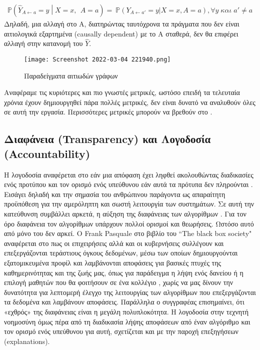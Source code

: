 \begin{align}
 \mathbb{P}\left({\hat{Y}}_{A\gets a}=y\middle| X=x,\ \ A=a\right)=\ \mathbb{P}(Y_{A\gets a\prime}=y|X=x,A=a),∀ y   \; και \; a'≠a
\end{align}
Δηλαδή, μια αλλαγή στο A, διατηρώντας ταυτόχρονα τα πράγματα που δεν είναι αιτιολογικά εξαρτημένα (causally dependent) με το Α σταθερά, δεν θα επιφέρει αλλαγή στην κατανομή του $  \hat{Y }$.\\
\begin{figure}[H]
	\centering
	\texttt{[image: Screenshot 2022-03-04 221940.png]}
	\caption{Παραδείγματα αιτιωδών γράφων}
	\label{fig:countfairness}
\end{figure}
\noindent Αναφέραμε τις κυριότερες και πιο γνωστές μετρικές, ωστόσο επειδή τα τελευταία χρόνια έχουν δημιουργηθεί πάρα πολλές μετρικές, δεν είναι δυνατό να αναλυθούν όλες σε αυτή την εργασία. Περισσότερες μετρικές μπορούν να βρεθούν στο \cite{catonFairnessMachineLearning2020}.
\subsection{Διαφάνεια (Transparency) και Λογοδοσία (Accountability)}
\noindent Η λογοδοσία αναφέρεται στο εάν μια απόφαση έχει ληφθεί ακολουθώντας διαδικασίες ενός προτύπου και τον ορισμό ενός υπεύθυνου εάν αυτά τα πρότυπα δεν πληρούνται \cite{krollAccountableAlgorithms}. Εισάγει δηλαδή και την σημασία του ανθρώπινου παράγοντα ως απαραίτητη προϋπόθεση για την αμερόληπτη και σωστή λειτουργία των συστημάτων. Σε αυτή την κατεύθυνση συμβάλλει αρκετά, η αύξηση της διαφάνειας των αλγορίθμων \cite{diakopoulosAccountabilityAlgorithmicDecision2016}. Για τον όρο διαφάνεια τον αλγορίθμων υπάρχουν πολλοί ορισμοί και θεωρήσεις. Ωστόσο αυτό από μόνο του δεν αρκεί. Ο Frank Pasquale στο βιβλίο του ``The black box society" \cite{pasqualeBlackBoxSociety2015} αναφέρεται στο πως οι επιχειρήσεις αλλά και οι κυβερνήσεις συλλέγουν και επεξεργάζονται τεράστιους όγκους δεδομένων, μέσω των οποίων δημιουργούνται εξατομικευμένα προφίλ και λαμβάνονται αποφάσεις για βασικές πτυχές της καθημερινότητας και της ζωής μας, όπως για παράδειγμα η λήψη ενός δανείου ή η επιλογή μαθητών που θα φοιτήσουν σε ένα κολλέγιο \cite{adamsAlevelResultsAlmost2020}, χωρίς να μας δίνουν την δυνατότητα για λεπτομερή έλεγχο της λειτουργίας των αλγορίθμων που επεξεργάζονται τα δεδομένα και λαμβάνουν αποφάσεις. Παράλληλα ο συγγραφέας επισημαίνει, ότι «εχθρός» της διαφάνειας είναι η μεγάλη πολυπλοκότητα. Η λογοδοσία στην τεχνητή νοημοσύνη όμως πέρα από τη διαδικασία λήψης αποφάσεων από έναν αλγόριθμο και τον ορισμό ενός υπεύθυνου για αυτή, σχετίζεται και με την παροχή επεξηγήσεων (explanations). 
